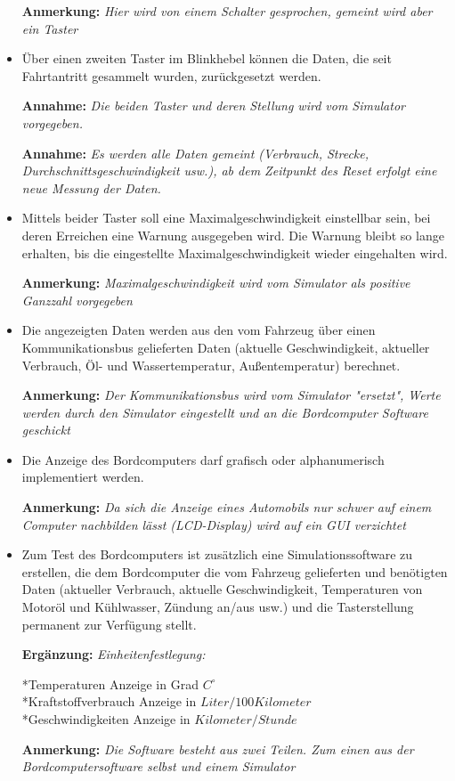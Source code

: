 \documentclass[a4paper,12pt]{article}
\begin{document}
\begin{itemize}
\textbf{Anmerkung:} \emph{Hier wird von einem Schalter gesprochen, gemeint wird aber ein Taster}

\item Über einen zweiten Taster im Blinkhebel können die Daten, die seit Fahrtantritt gesammelt wurden, zurückgesetzt werden. 

\textbf{Annahme:} \emph{Die beiden Taster und deren Stellung wird vom Simulator vorgegeben.}

\textbf{Annahme:} \emph{Es werden alle Daten gemeint (Verbrauch, Strecke, Durchschnittsgeschwindigkeit usw.), ab dem Zeitpunkt des Reset erfolgt eine neue Messung der Daten.}

\item Mittels beider Taster soll eine Maximalgeschwindigkeit einstellbar sein, bei deren Erreichen eine Warnung ausgegeben wird. Die Warnung bleibt so lange erhalten, bis die eingestellte Maximalgeschwindigkeit wieder eingehalten wird.

\textbf{Anmerkung:} \emph{Maximalgeschwindigkeit wird vom Simulator als positive Ganzzahl vorgegeben}

\item Die angezeigten Daten werden aus den vom Fahrzeug über einen Kommunikations­bus gelieferten Daten (aktuelle Geschwindigkeit, aktueller Verbrauch, Öl- und Wassertemperatur, Außentemperatur) berechnet. 

\textbf{Anmerkung:} \emph{Der Kommunikationsbus wird vom Simulator "ersetzt", Werte werden durch den Simulator eingestellt und an die Bordcomputer Software geschickt}

\item Die Anzeige des Bordcomputers darf grafisch oder alphanumerisch implementiert werden.

\textbf{Anmerkung:} \emph{Da sich die Anzeige eines Automobils nur schwer auf einem Computer nachbilden lässt (LCD-Display) wird auf ein GUI verzichtet}

\item Zum Test des Bordcomputers ist zusätzlich eine Simulationssoftware zu erstellen, die dem Bordcomputer die vom Fahrzeug gelieferten und benötigten Daten (aktueller Verbrauch, aktuelle Geschwindigkeit, Temperaturen von Motoröl und Kühlwasser, Zündung an/aus usw.) und die Tasterstellung permanent zur Verfügung stellt.

\textbf{Ergänzung:} \emph{Einheitenfestlegung:}

*Temperaturen Anzeige in Grad $C^{\circ}$\\
*Kraftstoffverbrauch Anzeige in $Liter/100 Kilometer$\\
*Geschwindigkeiten Anzeige in $Kilometer/Stunde$

\textbf{Anmerkung:} \emph{Die Software besteht aus zwei Teilen. Zum einen aus der Bordcomputersoftware selbst und einem Simulator}

\end{itemize}
\end{document}

